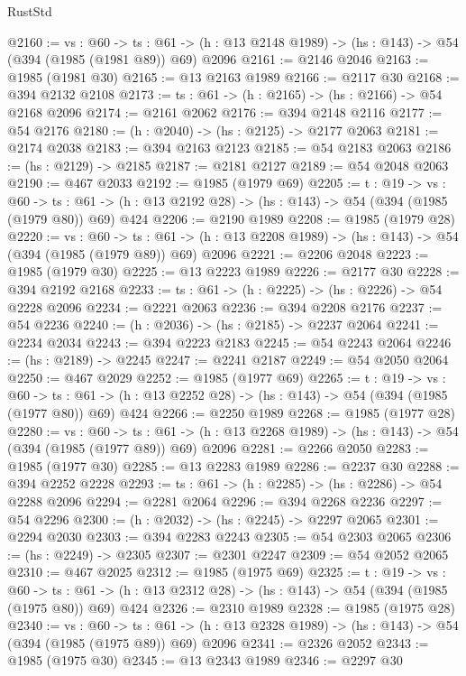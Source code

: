 \begin{lexlean}{RustStd}
\begin{coremodule}
{\begin{coremodule}
{{{{{{{{@2160 := {vs : @60} ->
  {ts : @61} -> (h : @13 @2148 @1989) -> (hs : @143) -> @54 (@394 (@1985 (@1981 @89)) @69) @2096
@2161 := @2146 @2046
@2163 := @1985 (@1981 @30)
@2165 := @13 @2163 @1989
@2166 := @2117 @30
@2168 := @394 @2132 @2108
@2173 := {ts : @61} -> (h : @2165) -> (hs : @2166) -> @54 @2168 @2096
@2174 := @2161 @2062
@2176 := @394 @2148 @2116
@2177 := @54 @2176
@2180 := (h : @2040) -> (hs : @2125) -> @2177 @2063
@2181 := @2174 @2038
@2183 := @394 @2163 @2123
@2185 := @54 @2183 @2063
@2186 := (hs : @2129) -> @2185
@2187 := @2181 @2127
@2189 := @54 @2048 @2063
@2190 := @467 @2033
@2192 := @1985 (@1979 @69)
@2205 := {t : @19} ->
  {vs : @60} ->
  {ts : @61} -> (h : @13 @2192 @28) -> (hs : @143) -> @54 (@394 (@1985 (@1979 @80)) @69) @424
@2206 := @2190 @1989
@2208 := @1985 (@1979 @28)
@2220 := {vs : @60} ->
  {ts : @61} -> (h : @13 @2208 @1989) -> (hs : @143) -> @54 (@394 (@1985 (@1979 @89)) @69) @2096
@2221 := @2206 @2048
@2223 := @1985 (@1979 @30)
@2225 := @13 @2223 @1989
@2226 := @2177 @30
@2228 := @394 @2192 @2168
@2233 := {ts : @61} -> (h : @2225) -> (hs : @2226) -> @54 @2228 @2096
@2234 := @2221 @2063
@2236 := @394 @2208 @2176
@2237 := @54 @2236
@2240 := (h : @2036) -> (hs : @2185) -> @2237 @2064
@2241 := @2234 @2034
@2243 := @394 @2223 @2183
@2245 := @54 @2243 @2064
@2246 := (hs : @2189) -> @2245
@2247 := @2241 @2187
@2249 := @54 @2050 @2064
@2250 := @467 @2029
@2252 := @1985 (@1977 @69)
@2265 := {t : @19} ->
  {vs : @60} ->
  {ts : @61} -> (h : @13 @2252 @28) -> (hs : @143) -> @54 (@394 (@1985 (@1977 @80)) @69) @424
@2266 := @2250 @1989
@2268 := @1985 (@1977 @28)
@2280 := {vs : @60} ->
  {ts : @61} -> (h : @13 @2268 @1989) -> (hs : @143) -> @54 (@394 (@1985 (@1977 @89)) @69) @2096
@2281 := @2266 @2050
@2283 := @1985 (@1977 @30)
@2285 := @13 @2283 @1989
@2286 := @2237 @30
@2288 := @394 @2252 @2228
@2293 := {ts : @61} -> (h : @2285) -> (hs : @2286) -> @54 @2288 @2096
@2294 := @2281 @2064
@2296 := @394 @2268 @2236
@2297 := @54 @2296
@2300 := (h : @2032) -> (hs : @2245) -> @2297 @2065
@2301 := @2294 @2030
@2303 := @394 @2283 @2243
@2305 := @54 @2303 @2065
@2306 := (hs : @2249) -> @2305
@2307 := @2301 @2247
@2309 := @54 @2052 @2065
@2310 := @467 @2025
@2312 := @1985 (@1975 @69)
@2325 := {t : @19} ->
  {vs : @60} ->
  {ts : @61} -> (h : @13 @2312 @28) -> (hs : @143) -> @54 (@394 (@1985 (@1975 @80)) @69) @424
@2326 := @2310 @1989
@2328 := @1985 (@1975 @28)
@2340 := {vs : @60} ->
  {ts : @61} -> (h : @13 @2328 @1989) -> (hs : @143) -> @54 (@394 (@1985 (@1975 @89)) @69) @2096
@2341 := @2326 @2052
@2343 := @1985 (@1975 @30)
@2345 := @13 @2343 @1989
@2346 := @2297 @30
}}}}}}}}
\end{coremodule}}
\end{coremodule}
\end{lexlean}
